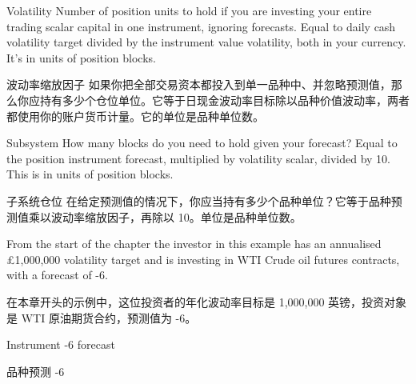 \bipairgap

\begin{englishblock} Volatility Number of position units to hold if you are investing your entire trading scalar capital in one instrument, ignoring forecasts. Equal to daily cash volatility target divided by the instrument value volatility, both in your currency. It's in units of position blocks. \end{englishblock}

\begin{chineseblock}波动率缩放因子 如果你把全部交易资本都投入到单一品种中、并忽略预测值，那么你应持有多少个仓位单位。它等于日现金波动率目标除以品种价值波动率，两者都使用你的账户货币计量。它的单位是品种单位数。\end{chineseblock}

\bipairgap

\begin{englishblock} Subsystem How many blocks do you need to hold given your forecast? Equal to the position instrument forecast, multiplied by volatility scalar, divided by 10. This is in units of position blocks. \end{englishblock}

\begin{chineseblock}子系统仓位 在给定预测值的情况下，你应当持有多少个品种单位？它等于品种预测值乘以波动率缩放因子，再除以 10。单位是品种单位数。\end{chineseblock}


\begin{englishblock} From the start of the chapter the investor in this example has an annualised £1,000,000 volatility target and is investing in WTI Crude oil futures contracts, with a forecast of -6. \end{englishblock}

\begin{chineseblock}在本章开头的示例中，这位投资者的年化波动率目标是 1,000,000 英镑，投资对象是 WTI 原油期货合约，预测值为 -6。 \end{chineseblock}

\bipairgap

\begin{englishblock} Instrument -6 forecast \end{englishblock}

\begin{chineseblock}品种预测 -6 \end{chineseblock}

